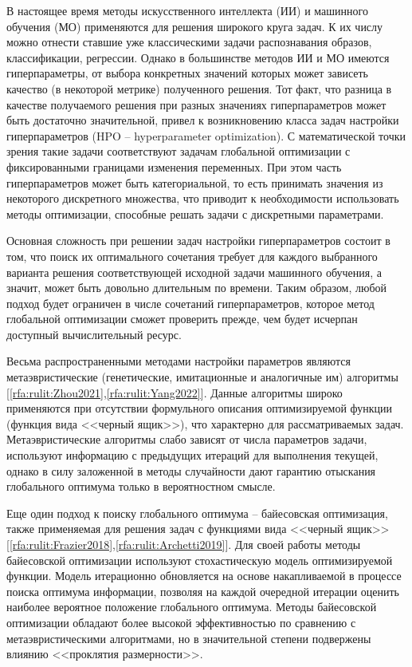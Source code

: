 \documentclass[a4paper,12pt,russian]{article}
\begin{document}

В настоящее время методы искусственного интеллекта (ИИ) и машинного обучения (МО) применяются для решения широкого круга задач. К их числу можно отнести ставшие уже классическими задачи распознавания образов, классификации, регрессии. 
Однако в большинстве методов ИИ и МО имеются гиперпараметры, от выбора конкретных значений которых может зависеть качество (в некоторой метрике) полученного решения. Тот факт, что разница в качестве получаемого решения при разных значениях гиперпараметров может быть достаточно значительной, привел к возникновению класса задач настройки гиперпараметров (HPO -- hyperparameter optimization). С математической точки зрения такие задачи соответствуют задачам глобальной оптимизации с фиксированными границами изменения переменных. При этом часть гиперпараметров может быть категориальной, то есть принимать значения из некоторого дискретного множества, что приводит к необходимости использовать методы оптимизации, способные решать задачи с дискретными параметрами.

Основная сложность при решении  задач настройки гиперпараметров состоит  в  том, что поиск их оптимального сочетания требует для каждого выбранного варианта решения соответствующей исходной задачи машинного обучения, а значит, может быть довольно длительным по времени. Таким образом, любой подход будет ограничен в числе сочетаний гиперпараметров, которое метод глобальной оптимизации сможет проверить прежде, чем будет исчерпан доступный вычислительный ресурс. 

Весьма распространенными методами настройки параметров являются метаэвристические (генетические, имитационные и аналогичные им) алгоритмы [\ref{rfa:rulit:Zhou2021},\ref{rfa:rulit:Yang2022}]. Данные алгоритмы широко применяются при отсутствии формульного описания оптимизируемой функции (функция вида <<черный ящик>>), что характерно для рассматриваемых задач. Метаэвристические алгоритмы слабо зависят от числа параметров задачи, используют информацию с предыдущих итераций для выполнения текущей, однако в силу заложенной в методы случайности дают гарантию отыскания глобального оптимума только в вероятностном смысле.

Еще один подход к поиску глобального оптимума -- байесовская оптимизация, также применяемая для решения задач с функциями вида <<черный ящик>> [\ref{rfa:rulit:Frazier2018},\ref{rfa:rulit:Archetti2019}]. Для своей работы методы байесовской оптимизации используют стохастическую модель оптимизируемой функции. Модель итерационно обновляется на основе накапливаемой в процессе поиска оптимума информации, позволяя на каждой очередной итерации оценить наиболее вероятное положение глобального оптимума. Методы байесовской оптимизации обладают более  высокой  эффективностью по сравнению с метаэвристическими алгоритмами, но в значительной степени подвержены влиянию <<проклятия размерности>>.
\end{document}
